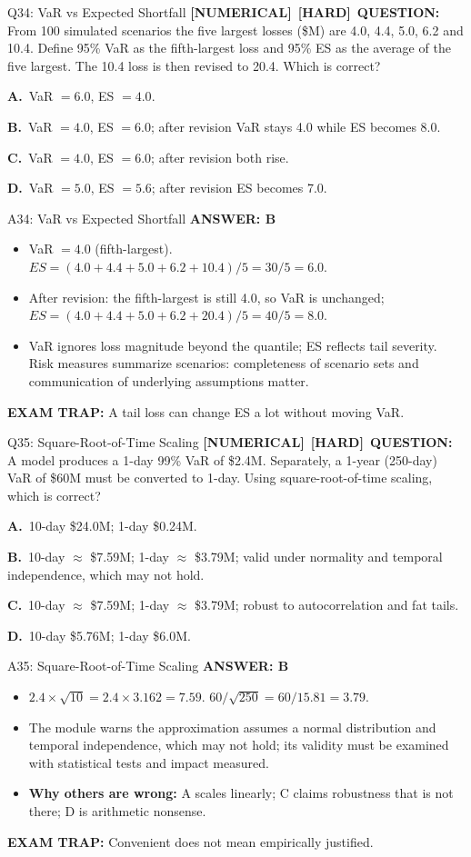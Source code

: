 \documentclass[8pt]{beamer}
\newcommand{\fs}{\fontsize{10}{12}\selectfont}
\newcommand{\opts}[4]{\par\vspace{0.12cm}\noindent\textbf{A.}~#1\par\vspace{0.08cm}\noindent\textbf{B.}~#2\par\vspace{0.08cm}\noindent\textbf{C.}~#3\par\vspace{0.08cm}\noindent\textbf{D.}~#4\par}
\newcommand{\ans}[1]{\textcolor{myblue}{\textbf{ANSWER: #1}}}
\newcommand{\trap}[1]{\textcolor{myred}{\textbf{EXAM TRAP:}} #1}
\newcommand{\numtag}{\textcolor{mypurple}{\textbf{[NUMERICAL]}}}
\newcommand{\hard}{\textcolor{myorange}{\textbf{[HARD]}}}
\begin{document}
\begin{frame}[t]{Q34: VaR vs Expected Shortfall}
\fs
\numtag\ \hard\ \textbf{QUESTION:} From 100 simulated scenarios the five largest losses (\$M) are 4.0, 4.4, 5.0, 6.2 and 10.4. Define 95\% VaR as the fifth-largest loss and 95\% ES as the average of the five largest. The 10.4 loss is then revised to 20.4. Which is correct?
\opts{VaR $=6.0$, ES $=4.0$.}
{VaR $=4.0$, ES $=6.0$; after revision VaR stays 4.0 while ES becomes 8.0.}
{VaR $=4.0$, ES $=6.0$; after revision both rise.}
{VaR $=5.0$, ES $=5.6$; after revision ES becomes 7.0.}
\end{frame}

\begin{frame}[t]{A34: VaR vs Expected Shortfall}
\fs
\ans{B}
\begin{itemize}
\item VaR $=4.0$ (fifth-largest). $ES=(4.0+4.4+5.0+6.2+10.4)/5=30/5=\mathbf{6.0}$.
\item After revision: the fifth-largest is still 4.0, so VaR is unchanged; $ES=(4.0+4.4+5.0+6.2+20.4)/5=40/5=\mathbf{8.0}$.
\item VaR ignores loss magnitude beyond the quantile; ES reflects tail severity. Risk measures summarize scenarios: completeness of scenario sets and communication of underlying assumptions matter.
\end{itemize}
\trap{A tail loss can change ES a lot without moving \textcolor{myblue}{VaR}.}
\end{frame}

\begin{frame}[t]{Q35: Square-Root-of-Time Scaling}
\fs
\numtag\ \hard\ \textbf{QUESTION:} A model produces a 1-day 99\% VaR of \$2.4M. Separately, a 1-year (250-day) VaR of \$60M must be converted to 1-day. Using square-root-of-time scaling, which is correct?
\opts{10-day \$24.0M; 1-day \$0.24M.}
{10-day $\approx$ \$7.59M; 1-day $\approx$ \$3.79M; valid under normality and temporal independence, which may not hold.}
{10-day $\approx$ \$7.59M; 1-day $\approx$ \$3.79M; robust to autocorrelation and fat tails.}
{10-day \$5.76M; 1-day \$6.0M.}
\end{frame}

\begin{frame}[t]{A35: Square-Root-of-Time Scaling}
\fs
\ans{B}
\begin{itemize}
\item $2.4\times\sqrt{10}=2.4\times3.162=\mathbf{7.59}$. $60/\sqrt{250}=60/15.81=\mathbf{3.79}$.
\item The module warns the approximation assumes a normal distribution and temporal independence, which may not hold; its validity must be examined with statistical tests and impact measured.
\item \textbf{Why others are wrong:} A scales linearly; C claims robustness that is not there; D is arithmetic nonsense.
\end{itemize}
\trap{Convenient does not mean \textcolor{myblue}{empirically justified}.}
\end{frame}
\end{document}
